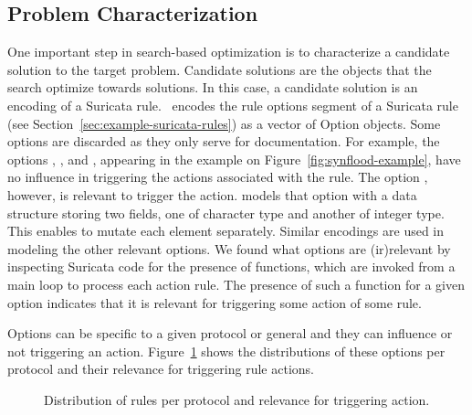 \documentclass[runningheads]{llncs}
\begin{document}
\subsection{Problem Characterization}

One important step in search-based optimization is to characterize a
candidate solution to the target problem. Candidate solutions are the
objects that the search optimize towards solutions. In this case, a 
candidate solution is an encoding of a Suricata rule.  \tname\ encodes
the rule options segment of a Suricata rule (see
Section~\ref{sec:example-suricata-rules}) as a vector of Option
objects. Some options are discarded as they only serve for
documentation. For example, the options ,
, and , appearing in the
example on Figure~\ref{fig:synflood-example}, have no influence in
triggering the actions associated with the rule. The option
, however, is relevant to trigger the action. \tname{}
models that option with a data structure storing two fields, one of
character type and another of integer type. This enables \tname{} to
mutate each element separately. Similar encodings are used in modeling
the other relevant options. We found what options are (ir)relevant by
inspecting Suricata code for the presence of  functions,
which are invoked from a main loop to process each action rule. The
presence of such a function for a given option indicates that it is
relevant for triggering some action of some rule.

Options can be specific to a given protocol or general and they can
influence or not triggering an
action. Figure~\ref{fig:distribution-rules-protocol} shows the
distributions of these options per protocol and their relevance for
triggering rule actions.

\pgfplotsset{width=5.5cm,compat=1.8}
\begin{figure}[h!]
  \centering
  \caption{\label{fig:distribution-rules-protocol}Distribution of
    rules per protocol and relevance for triggering action.}
\end{figure}
\end{document}
